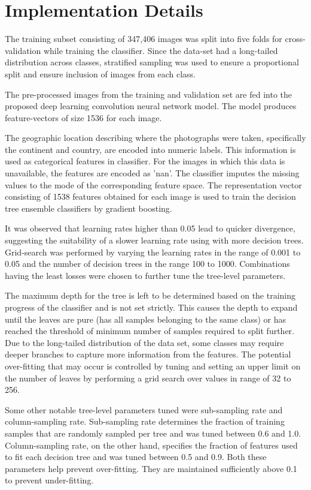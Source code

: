 \documentclass[
]{ceurart}
\begin{document}
\section{Implementation Details}

The training subset consisting of 347,406 images was split into five folds for cross-validation while training the classifier. Since the data-set had a long-tailed distribution across classes, stratified sampling was used to ensure a proportional split and ensure inclusion of images from each class.

The pre-processed images from the training and validation set are fed into the proposed deep learning convolution neural network model. The model produces feature-vectors of size 1536 for each image. 

The geographic location describing where the photographs were taken, specifically the continent and country, are encoded into numeric labels. This information is used as categorical features in classifier. For the images in which this data is unavailable, the features are encoded as 'nan'. The classifier imputes the missing values to the mode of the corresponding feature space. The representation vector consisting of 1538 features obtained for each image is used to train the decision tree ensemble classifiers by gradient boosting.

It was observed that learning rates higher than 0.05 lead to quicker divergence, suggesting the suitability of a slower learning rate using with more decision trees. Grid-search was performed by varying the learning rates in the range of 0.001 to 0.05 and the number of decision trees in the range 100 to 1000. Combinations having the least losses were chosen to further tune the tree-level parameters.

The maximum depth for the tree is left to be determined based on the training progress of the classifier and is not set strictly. This causes the depth to expand until the leaves are pure (has all samples belonging to the same class) or has reached the threshold of minimum number of samples required to split further. Due to the long-tailed distribution of the data set, some classes may require deeper branches to capture more information from the features. The potential over-fitting that may occur is controlled by tuning and setting an upper limit on the number of leaves by performing a grid search over values in range of 32 to 256.

Some other notable tree-level parameters tuned were sub-sampling rate and column-sampling rate. Sub-sampling rate determines the fraction of training samples that are randomly sampled per tree and was tuned between 0.6 and 1.0. Column-sampling rate, on the other hand, specifies the fraction of features used to fit each decision tree and was tuned between 0.5 and 0.9. Both these parameters help prevent over-fitting. They are maintained sufficiently above 0.1 to prevent under-fitting.
\end{document}
